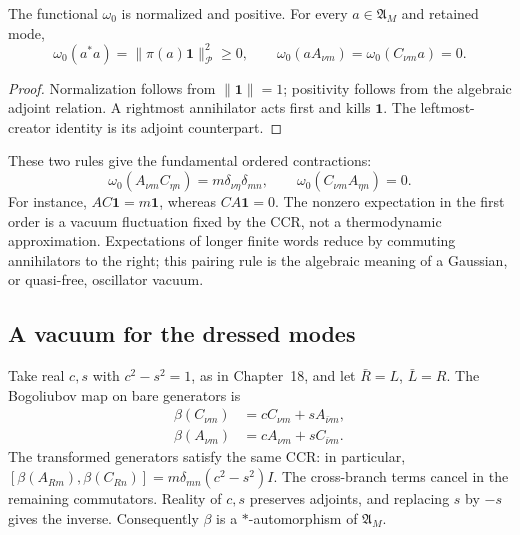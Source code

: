 \begin{proposition}
\label{prop:ch19-polynomial-state}
The functional $\omega_0$ is normalized and positive.  For every
$a\in\mathfrak A_M$ and retained mode,
\begin{equation}
 \omega_0(a^*a)=\|\pi(a)\mathbf1\|_{\mathcal P}^2\geq0,
 \qquad
 \omega_0(aA_{\nu m})=\omega_0(C_{\nu m}a)=0.
 \label{eq:ch19-omega0-positive}
\end{equation}
\end{proposition}
\begin{proof}
Normalization follows from $\|\mathbf1\|=1$; positivity follows
from the algebraic adjoint relation.  A rightmost annihilator acts
first and kills $\mathbf1$.  The leftmost-creator identity is its
adjoint counterpart.
\end{proof}

These two rules give the fundamental ordered contractions:
\begin{equation}
 \omega_0(A_{\nu m}C_{\eta n})
     =m\delta_{\nu\eta}\delta_{mn},
 \qquad \omega_0(C_{\nu m}A_{\eta n})=0.
 \label{eq:ch19-free-two-orders}
\end{equation}
For instance, $AC\mathbf1=m\mathbf1$, whereas
$CA\mathbf1=0$.  The nonzero expectation in the first order is a
vacuum fluctuation fixed by the CCR, not a thermodynamic
approximation.  Expectations of longer finite words reduce by
commuting annihilators to the right; this pairing rule is the
algebraic meaning of a Gaussian, or quasi-free, oscillator vacuum.

\subsection*{A vacuum for the dressed modes}

Take real $c,s$ with $c^2-s^2=1$, as in Chapter~18, and let
$\bar R=L$, $\bar L=R$.  The Bogoliubov map on bare generators is
\begin{equation}
 \begin{aligned}
 \beta(C_{\nu m})&=cC_{\nu m}+sA_{\bar\nu m},\\
 \beta(A_{\nu m})&=cA_{\nu m}+sC_{\bar\nu m}.
 \end{aligned}
 \label{eq:ch19-bogoliubov-creator}
\end{equation}
The transformed generators satisfy the same CCR: in particular,
$[\beta(A_{Rm}),\beta(C_{Rn})]
=m\delta_{mn}(c^2-s^2)I$.  The cross-branch terms cancel in the
remaining commutators.  Reality of $c,s$ preserves adjoints, and
replacing $s$ by $-s$ gives the inverse.  Consequently $\beta$ is a
$*$-automorphism of $\mathfrak A_M$.

